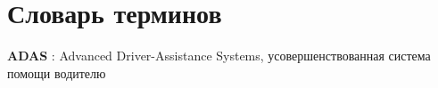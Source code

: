 \chapter*{Словарь терминов}             %

\textbf{ADAS} : Advanced Driver-Assistance Systems, усовершенствованная система помощи водителю 